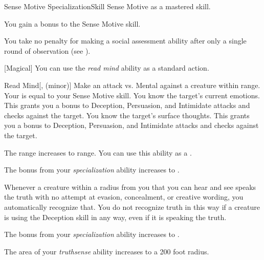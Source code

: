     \begin{feat}{Sense Motive Specialization}{Skill}
        \featpre Sense Motive as a mastered skill.

         You gain a  bonus to the Sense Motive skill.

         You take no penalty for making a social assessment ability after only a single round of observation (see ).

        [Magical] You can use the \textit{read mind} ability as a standard action.
        \begin{freeability}{Read Mind}[,  (minor)]
            Make an attack vs. Mental against a creature within \rngclose range.
            Your  is equal to your Sense Motive skill.
            \hit You know the target's current emotions.
            This grants you a  bonus to Deception, Persuasion, and Intimidate attacks and checks against the target.
            \crit You know the target's surface thoughts.
            This grants you a  bonus to Deception, Persuasion, and Intimidate attacks and checks against the target.

            \rankline
             The range increases to \rnglong range.
             You can use this ability as a .
        \end{freeability}

         The bonus from your \textit{specialization} ability increases to .

         Whenever a creature within a \arealarge radius  from you that you can hear and see speaks the truth with no attempt at evasion, concealment, or creative wording, you automatically recognize that.
        You do not recognize truth in this way if a creature is using the Deception skill in any way, even if it is speaking the truth.

         The bonus from your \textit{specialization} ability increases to .

         The area of your \textit{truthsense} ability increases to a 200 foot radius.
    \end{feat}

